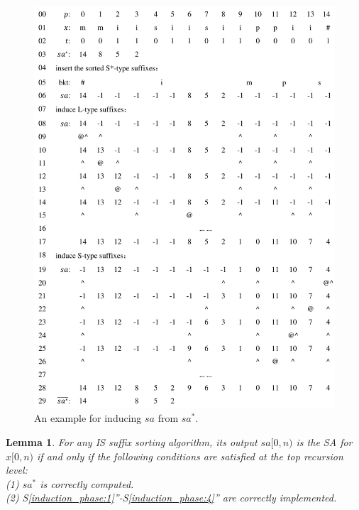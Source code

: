 \documentclass[10pt,journal,compsoc]{IEEEtran}
\newtheorem{lemma}[theorem]{Lemma}
\begin{document}
\begin{figure}[t]
	\centering
	
	\includegraphics[width = 1\columnwidth]{example.pdf}
	
	\caption{An example for inducing $sa$ from $sa^*$.}
	
	\label{fig:example1}
	
\end{figure}


\begin{lemma} \label{lemma:2}
    For any IS suffix sorting algorithm, its output $sa[0, n)$ is the SA for $x[0, n)$ if and only if the following conditions are satisfied at the top recursion level: \\
    (1) $sa^*$ is correctly computed. \\
    (2) S\ref{induction_phase:1}''-S\ref{induction_phase:4}'' are correctly implemented. \\
\end{lemma}
\end{document}
